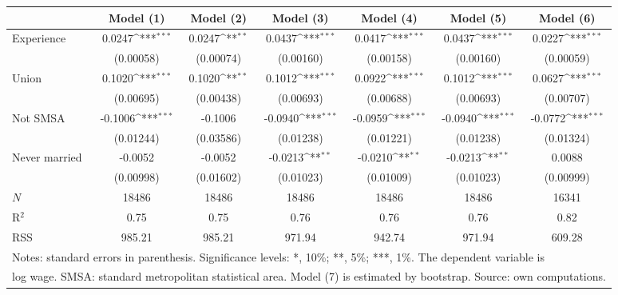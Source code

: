 {
\def\sym#1{\ifmmode^{#1}\else\(^{#1}\)\fi}
\begin{tabular}{l*{6}{c}}
\hline\hline
            &\multicolumn{1}{c}{Model (1)}&\multicolumn{1}{c}{Model (2)}&\multicolumn{1}{c}{Model (3)}&\multicolumn{1}{c}{Model (4)}&\multicolumn{1}{c}{Model (5)}&\multicolumn{1}{c}{Model (6)}\\
\hline
Experience  &      0.0247\sym{***}&      0.0247\sym{**} &      0.0437\sym{***}&      0.0417\sym{***}&      0.0437\sym{***}&      0.0227\sym{***}\\
            &   (0.00058)         &   (0.00074)         &   (0.00160)         &   (0.00158)         &   (0.00160)         &   (0.00059)         \\
[1em]
Union       &      0.1020\sym{***}&      0.1020\sym{**} &      0.1012\sym{***}&      0.0922\sym{***}&      0.1012\sym{***}&      0.0627\sym{***}\\
            &   (0.00695)         &   (0.00438)         &   (0.00693)         &   (0.00688)         &   (0.00693)         &   (0.00707)         \\
[1em]
Not SMSA    &     -0.1006\sym{***}&     -0.1006         &     -0.0940\sym{***}&     -0.0959\sym{***}&     -0.0940\sym{***}&     -0.0772\sym{***}\\
            &   (0.01244)         &   (0.03586)         &   (0.01238)         &   (0.01221)         &   (0.01238)         &   (0.01324)         \\
[1em]
Never married&     -0.0052         &     -0.0052         &     -0.0213\sym{**} &     -0.0210\sym{**} &     -0.0213\sym{**} &      0.0088         \\
            &   (0.00998)         &   (0.01602)         &   (0.01023)         &   (0.01009)         &   (0.01023)         &   (0.00999)         \\
\hline
\(N\)       &       18486         &       18486         &       18486         &       18486         &       18486         &       16341         \\
R$^2$       &        0.75         &        0.75         &        0.76         &        0.76         &        0.76         &        0.82         \\
RSS         &      985.21         &      985.21         &      971.94         &      942.74         &      971.94         &      609.28         \\
\hline\hline
\multicolumn{7}{l}{\footnotesize Notes: standard errors in parenthesis. Significance levels: *, 10\%; **, 5\%; ***, 1\%. The dependent variable is}\\
\multicolumn{7}{l}{\footnotesize log wage. SMSA: standard metropolitan statistical area. Model (7) is estimated by bootstrap. Source: own computations.}\\
\end{tabular}
}

